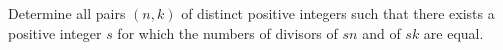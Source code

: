 Determine all pairs $(n,k)$ of distinct positive integers such that there exists a positive integer $s$ for which the numbers of divisors of $sn$ and of $sk$ are equal.
